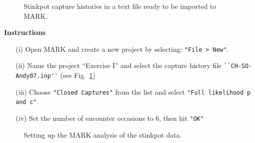 \documentclass[12pt]{article}
\begin{document}
\begin{figure}[h!]
  \centering
  \caption{\small Stinkpot capture histories in a text file ready to
    be imported to MARK.}
  \label{fig:stink07-data}
\end{figure}

\clearpage

{\bf Instructions}
\begin{enumerate}
  \item[(i)] Open MARK and create a new project by selecting:
    \verb+"File > New"+.
  \item[(ii)] Name the project ``Exercise I'' and select the capture
    history file \verb+``CH-SO-Andy07.inp''+ (see
    Fig.~\ref{fig:stink07-data})
  \item[(iii)] Choose \verb+"Closed Captures"+ from the list and select
    \verb+"Full likelihood p and c"+.
  \item[(iv)] Set the number of encounter occasions to 6, then hit
    \verb+"OK"+
\end{enumerate}

\begin{figure}[h!]
  \centering
  \caption{\small Setting up the MARK analysis of the stinkpot data.}
  \label{fig:stink07-mark}
\end{figure}
\end{document}
